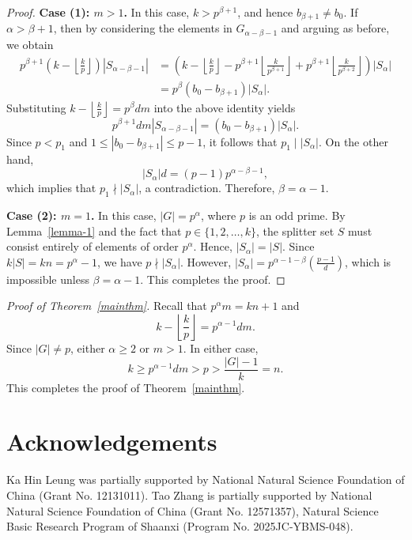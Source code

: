 \documentclass[12pt]{article}
\begin{document}
\begin{proof}
\medskip

\noindent\textbf{Case (1): \(m > 1\).}
In this case, $k>p^{\beta+1}$, and hence \(b_{\beta+1} \ne b_0\). If \(\alpha > \beta+1\), then by considering the elements in \(G_{\alpha-\beta-1}\) and arguing as before, we obtain
\begin{align*}
p^{\beta+1}\left(k - \left\lfloor \frac{k}{p} \right\rfloor\right) |S_{\alpha-\beta-1}|
&= \left(k - \left\lfloor \frac{k}{p} \right\rfloor - p^{\beta+1} \left\lfloor \frac{k}{p^{\beta+1}} \right\rfloor + p^{\beta+1} \left\lfloor \frac{k}{p^{\beta+2}} \right\rfloor\right) |S_{\alpha}| \\
&= p^{\beta} (b_0 - b_{\beta+1}) |S_{\alpha}|.
\end{align*}
Substituting $k - \left\lfloor \frac{k}{p} \right\rfloor=p^{\beta}dm$ into the above identity yields
\[
p^{\beta+1}dm|S_{\alpha-\beta-1}| = (b_0 - b_{\beta+1}) |S_{\alpha}|.
\]
Since \(p < p_1\) and \(1 \le |b_0 - b_{\beta+1}| \le p-1\), it follows that \(p_1 \mid |S_{\alpha}|\). On the other hand,
\[
|S_{\alpha}| d = (p-1) p^{\alpha-\beta-1},
\]
which implies that \(p_1 \nmid |S_{\alpha}|\), a contradiction. Therefore, \(\beta = \alpha - 1\).

\medskip

\noindent\textbf{Case (2): \(m = 1\).}
In this case, \(|G| = p^{\alpha}\), where \(p\) is an odd prime. By Lemma~\ref{lemma-1} and the fact that $p\in \{1,2,\ldots, k\}$, the splitter set \(S\) must consist entirely of elements of order \(p^\alpha\). Hence,  \(|S_{\alpha}| = |S|\). Since $k|S|=kn=p^{\alpha}-1$, we have $p\nmid |S_{\alpha}|$. However, 
$|S_\alpha| = p^{\alpha - 1 - \beta} \left(\frac{p - 1}{d}\right)$, which is impossible unless $\beta=\alpha-1$. This completes the proof.
\end{proof}

\bigskip

\noindent\textit{Proof of Theorem~\ref{mainthm}.}
Recall that \(p^\alpha m = kn + 1\) and
\[
k - \left\lfloor \frac{k}{p} \right\rfloor = p^{\alpha-1} d m.
\]
Since $|G|\neq p$,  either $\alpha\ge 2$ or $m>1$.  In either case, 
\[ k\ge p^{\alpha-1} d m>p>\frac{|G|-1}{k}=n.\]
This completes the proof of Theorem~\ref{mainthm}.


\section*{Acknowledgements}
Ka Hin Leung was partially supported by National Natural Science Foundation of China (Grant No. 12131011).
Tao Zhang is partially supported by National Natural Science Foundation of China (Grant No. 12571357),
Natural Science Basic Research Program of Shaanxi  (Program No. 2025JC-YBMS-048).
\end{document}
